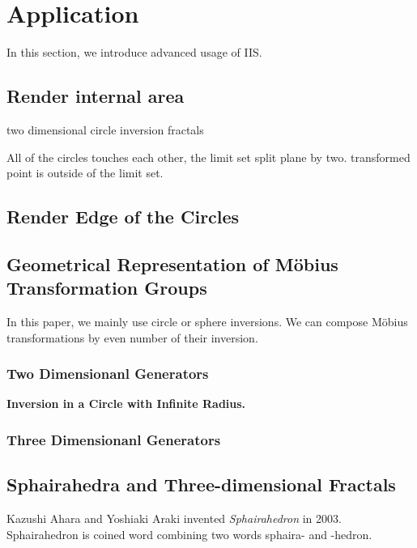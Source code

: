 
\section{Application}

In this section, we introduce advanced usage of IIS.

\subsection{Render internal area}


two dimensional circle inversion fractals

All of the circles touches each other, the limit set split plane by two.
transformed point is outside of the limit set.

\subsection{Render Edge of the Circles}


\subsection{Geometrical Representation of M\"obius Transformation Groups}


In this paper, we mainly use circle or sphere inversions.
We can compose M\"obius transformations by even number of their
inversion.


\subsubsection{Two Dimensionanl Generators}

\noindent\textbf{Inversion in a Circle with Infinite Radius.}

\subsubsection{Three Dimensionanl Generators}



\subsection{Sphairahedra and Three-dimensional Fractals}


Kazushi Ahara and Yoshiaki Araki invented \textit{Sphairahedron} in
2003.
Sphairahedron is coined word combining two words sphaira- and -hedron.